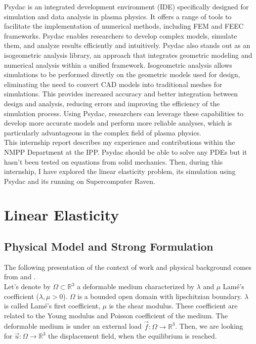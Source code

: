 \documentclass[a4paper,12pt,twoside]{report}
\newcommand{\mtr}{\mathbb{R}}
\begin{document}
Psydac is an integrated development environment (IDE) specifically designed for simulation and data analysis in plasma physics. It offers a range of tools to facilitate the implementation of numerical methods, including FEM and FEEC frameworks. Psydac enables researchers to develop complex models, simulate them, and analyze results efficiently and intuitively. Psydac also stands out as an isogeometric analysis library, an approach that integrates geometric modeling and numerical analysis within a unified framework. Isogeometric analysis allows simulations to be performed directly on the geometric models used for design, eliminating the need to convert CAD models into traditional meshes for simulations. This provides increased accuracy and better integration between design and analysis, reducing errors and improving the efficiency of the simulation process. Using Psydac, researchers can leverage these capabilities to develop more accurate models and perform more reliable analyses, which is particularly advantageous in the complex field of plasma physics. \\

This internship report describes my experience and contributions within the NMPP Department at the IPP. Psydac should be able to solve any PDEs but it hasn't been tested on equations from solid mechanics. Then, during this internship, I have explored the linear elasticity problem, its simulation using Psydac and its running on Supercomputer Raven.

\chapter{Linear Elasticity}

\section{Physical Model and Strong Formulation}
The following presentation of the context of work and physical background comes from \cite{gould_introduction_2013} and \cite{ern_theory_2004}. \\
Let's denote by $\Omega \subset \mtr^3$ a deformable medium characterized by $\lambda$ and $\mu$ Lamé's coefficient ($\lambda, \mu > 0$). $\Omega$ is a bounded open domain with lipschitzian boundary. $\lambda$ is called Lamé's first coefficient, $\mu$ is the shear modulus. These coefficient are related to the Young modulus and Poisson coefficient of the medium. The deformable medium is under an external load $\vec f : \Omega \rightarrow \mtr^3$. Then, we are looking for $\vec u : \Omega \rightarrow \mtr^3$ the displacement field, when the equilibrium is reached. 
\end{document}
